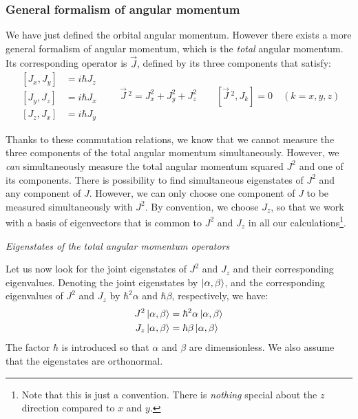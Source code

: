 \subsubsection{General formalism of angular momentum}

We have just defined the orbital angular momentum. However there exists a more general formalism of angular momentum, which is the \textit{total} angular momentum. Its corresponding operator is $\vec{J}$, defined by its three components that satisfy:
\begin{equation} \label{eq:commutation_relations_angular_momentum}
    \begin{split}
        [J_x, J_y] &= i\hbar J_z \\
        [J_y, J_z] &= i\hbar J_x \\
        [J_z, J_x] &= i\hbar J_y
    \end{split}\qquad \vec{J}\,^2 = J_x^2 + J_y^2 + J_z^2\qquad [\vec{J}\,^2, J_k] = 0\quad (k = x, y, z)
\end{equation}

Thanks to these commutation relations, we know that we cannot measure the three components of the total angular momentum simultaneously. However, we \textit{can} simultaneously measure the total angular momentum squared $J^2$ and one of its components. There is possibility to find simultaneous eigenstates of $J^2$ and any component of $J$. However, we can only choose one component of $J$ to be measured simultaneously with $J^2$. By convention, we choose $J_z$, so that we work with a basis of eigenvectors that is common to $J^2$ and $J_z$ in all our calculations\footnote{Note that this is just a convention. There is \textit{nothing} special about the $z$ direction compared to $x$ and $y$.}.

\textit{Eigenstates of the total angular momentum operators}

Let us now look for the joint eigenstates of $J^2$ and $J_z$ and their corresponding eigenvalues. Denoting the joint eigenstates by $\ket{\alpha, \beta}$, and the corresponding eigenvalues of $J^2$ and $J_z$ by $\hbar^2\alpha$ and $\hbar \beta$, respectively, we have:
\begin{equation} \label{eq:angular_momentum_eigenstates}
    \begin{split}
        J^2\ket{\alpha, \beta} &= \hbar^2\alpha\ket{\alpha, \beta} \\
        J_z\ket{\alpha, \beta} &= \hbar\beta\ket{\alpha, \beta}
    \end{split}
\end{equation}
The factor $\hbar$ is introduced so that $\alpha$ and $\beta$ are dimensionless. We also assume that the eigenstates are orthonormal.


